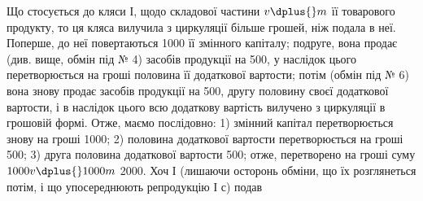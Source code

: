 Що стосується до кляси І, щодо складової частини $v \dplus{} m$ її товарового
продукту, то ця кляса вилучила з циркуляції більше грошей, ніж подала
в неї. Поперше, до неї повертаються 1000 її змінного капіталу;
подруге, вона продає (див. вище, обмін під № 4) засобів продукції
на 500, у наслідок цього перетворюється на гроші половина
її додаткової вартости; потім (обмін під № 6) вона знову продає засобів
продукції на 500, другу половину своєї додаткової вартости,
і в наслідок цього всю додаткову вартість вилучено з циркуляції в грошовій
формі. Отже, маємо послідовно: 1) змінний капітал перетворюється
знову на гроші \deq{} 1000; 2) половина додаткової вартости перетворюється
на гроші \deq{} 500; 3) друга половина додаткової
вартости \deq{} 500; отже, перетворено на гроші суму
$1000 v \dplus{} 1000 m$ \deq{} 2000. Хоч І (лишаючи осторонь обміни,
що їх розглянеться потім, і що упосереднюють репродукцію І $с$) подав
\parbreak{}  %
